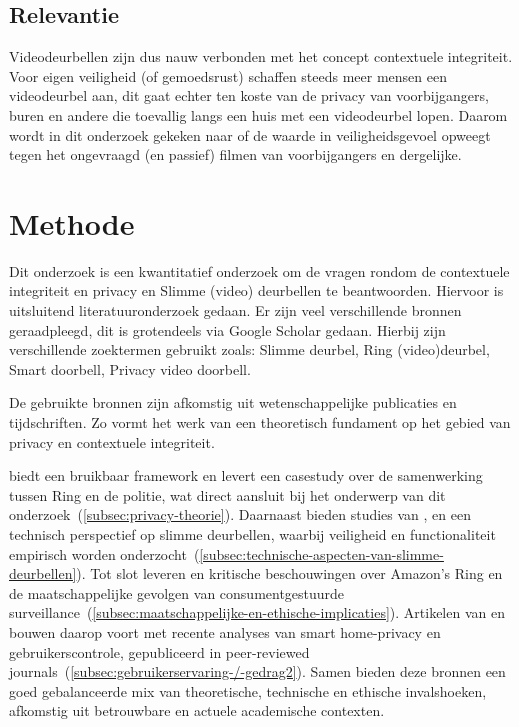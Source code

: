 \documentclass[nonacm, sigconf, balance=true]{acmart}
\begin{document}
    \subsection{Relevantie}
    Videodeurbellen zijn dus nauw verbonden met het concept contextuele integriteit.
    Voor eigen veiligheid (of gemoedsrust) schaffen steeds meer mensen een videodeurbel aan, dit gaat echter ten koste van de privacy van voorbijgangers, buren en andere die toevallig langs een huis met een videodeurbel lopen.
    Daarom wordt in dit onderzoek gekeken naar of de waarde in veiligheidsgevoel opweegt tegen het ongevraagd (en passief) filmen van voorbijgangers en dergelijke.


    \section{Methode}
    Dit onderzoek is een kwantitatief onderzoek om de vragen rondom de contextuele integriteit en privacy en Slimme (video) deurbellen te beantwoorden.
    Hiervoor is uitsluitend literatuuronderzoek gedaan.
    Er zijn veel verschillende bronnen geraadpleegd, dit is grotendeels via Google Scholar gedaan.
    Hierbij zijn verschillende zoektermen gebruikt zoals: Slimme deurbel, Ring (video)deurbel, Smart doorbell, Privacy video doorbell.

    De gebruikte bronnen zijn afkomstig uit wetenschappelijke publicaties en tijdschriften.
    Zo vormt het werk van \citeauthor{nissenbaum2009privacy} een theoretisch fundament op het gebied van privacy en contextuele integriteit.

    \citeauthor{van2016privacy} biedt een bruikbaar framework en \citeauthor{shaffer2021applying} levert een casestudy over de samenwerking tussen Ring en de politie, wat direct aansluit bij het onderwerp van dit onderzoek~(\ref{subsec:privacy-theorie}).
    Daarnaast bieden studies van \citeauthor{liu2021ethical}, \citeauthor{lalitha2019smart} en \citeauthor{chaudhari2020smart} een technisch perspectief op slimme deurbellen, waarbij veiligheid en functionaliteit empirisch worden onderzocht~(\ref{subsec:technische-aspecten-van-slimme-deurbellen}).
    Tot slot leveren \citeauthor{selinger2022amazon} en \citeauthor{kelly2023ring} kritische beschouwingen over Amazon's Ring en de maatschappelijke gevolgen van consumentgestuurde surveillance~(\ref{subsec:maatschappelijke-en-ethische-implicaties}).
    Artikelen van \citeauthor{shaffer2021applying} en \citeauthor{tabassum2023exploring} bouwen daarop voort met recente analyses van smart home-privacy en gebruikerscontrole, gepubliceerd in peer-reviewed journals~(\ref{subsec:gebruikerservaring-/-gedrag2}).
    Samen bieden deze bronnen een goed gebalanceerde mix van theoretische, technische en ethische invalshoeken, afkomstig uit betrouwbare en actuele academische contexten.
\end{document}
